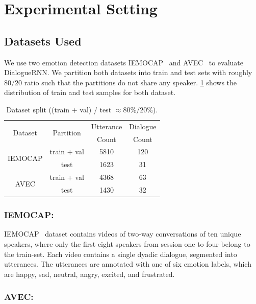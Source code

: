 \documentclass[letterpaper]{article} %
\begin{document}
\section{Experimental Setting}
\label{sec:experiments}

\subsection{Datasets Used}
\label{sec:dataset-details}

We use two emotion detection datasets IEMOCAP~\cite{iemocap} and
AVEC~\cite{Schuller:2012:ACA:2388676.2388776} to evaluate DialogueRNN. We partition
both datasets into train and test sets with roughly $80/20$ ratio
such that the partitions do not share any speaker. \cref{table:dataset} shows
the distribution of train and test samples for both dataset.

\begin{table}[h]
\small
\begin{center}
\begin{tabular}{|c|c|c|c|}
\hline
\multirow{2}{*}{Dataset}&\multirow{2}{*}{Partition}& Utterance & Dialogue\\
&& Count & Count\\
\hline
\hline
\multirow{2}{*}{IEMOCAP}&train + val&5810&120\\
\cline{2-4}&test&1623&31\\
\hline
\multirow{2}{*}{AVEC}&train + val&4368&63\\
\cline{2-4}&test&1430&32\\
\hline
\end{tabular}
\end{center}
\caption{Dataset split ((train + val) / test $\approx 80\%/20\%$).}
\label{table:dataset}
\end{table}

\subsubsection{IEMOCAP:}

IEMOCAP~\cite{iemocap} dataset contains videos of two-way conversations of ten
unique speakers, where only the first eight speakers from session one to four
belong to the train-set. Each video contains a single dyadic dialogue, segmented
into utterances. The utterances are annotated with one of six emotion labels,
which are happy, sad, neutral, angry, excited, and frustrated.

\subsubsection{AVEC:}
\end{document}
